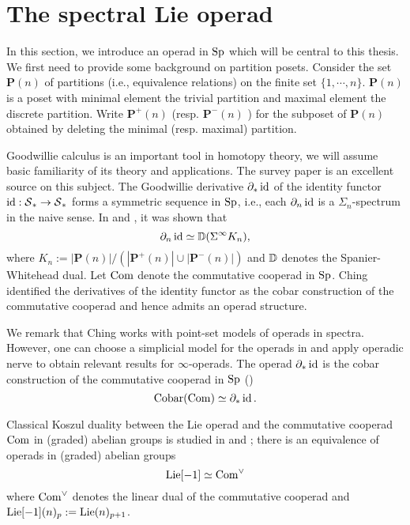 \section{The spectral Lie operad}
\label{The spectral Lie operad}
In this section, we introduce an operad in $\operatorname{Sp}$ which will be central to this thesis. 
We first need to provide some background on partition posets. 
Consider the set $\mathbf{P}(n)$ of partitions (i.e., equivalence relations) on the finite set $\{1, \cdots, n \}$. $\mathbf{P}(n)$ is a poset with minimal element the trivial partition and maximal element the discrete partition.
Write $\mathbf{P}^{+}(n)$ (resp. $\mathbf{P}^{-}(n)$ ) for the subposet of $\mathbf{P}(n)$ obtained by deleting the minimal (resp. maximal) partition.

    Goodwillie calculus is an important tool in homotopy theory, we will assume basic familiarity of its theory and applications. The survey paper \cite{Aone-Ching_Survey} is an excellent source on this subject.
	The Goodwillie derivative $\partial_* \operatorname{id}$ of the identity functor $\operatorname{id}: \operatorname{\mathcal{S}}_* \to \operatorname{\mathcal{S}}_*$ forms a symmetric sequence in $\operatorname{Sp}$, i.e., each $\partial_n \operatorname{id}$ is a $\Sigma_n$-spectrum in the naive sense. In \cite{JohnsonDerivative} and \cite{Arone-Mahowald}, it was shown that
	$$
	\partial_n \operatorname{id} \simeq {\mathbb{D}}(\Sigma^{\infty} K_n),
	$$
	where 
	$
	K_{n}:=|\mathbf{P}(n)| /\left(\left|\mathbf{P}^{+}(n)\right| \cup\left|\mathbf{P}^{-}(n)\right|\right)
	$
	and ${\mathbb{D}}$ denotes the Spanier-Whitehead dual. 
	Let $\operatorname{Com}$ denote the commutative cooperad in $\operatorname{Sp}$.
	Ching \cite{ChingBar} identified the derivatives of the identity functor as the cobar construction of the commutative cooperad and hence admits an operad structure.
	\begin{remark}
	We remark that Ching works with point-set models of operads in spectra. However, one can choose a simplicial model for the operads in \cite{Ching_Bar-cobar} and apply operadic nerve \cite[Definition 2.1.1.23.]{HA}
	to obtain relevant results for $\infty$-operads.
	The operad $\partial_* \operatorname{id}$ is the cobar construction of the commutative cooperad in $\operatorname{Sp}$ (\cite[Remark 8.9]{ChingBar})
	$$
	\operatorname{Cobar}(\operatorname{Com})\simeq \partial_* \operatorname{id}.
	$$
	\end{remark}
	
	\begin{remark}
    Classical Koszul duality between the Lie operad and the commutative cooperad $\operatorname{Com}$ in (graded) abelian groups is studied in \cite{Ginzburg-Kapranov} and \cite{Loday-Vallette};
    there is an equivalence of operads in (graded) abelian groups
    \[
    \operatorname{Lie}[-1] \simeq \operatorname{Com}^{\vee}
    \]
    where $\operatorname{Com}^{\vee}$ denotes the linear dual of the commutative cooperad and $\operatorname{Lie}[-1](n)_p:=\operatorname{Lie}(n)_{p+1}$.
    \end{remark}
    
